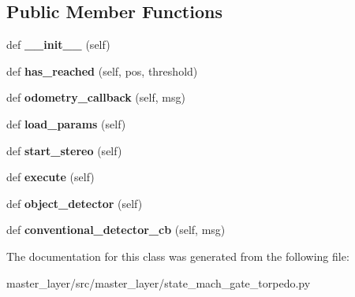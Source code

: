 \subsection*{Public Member Functions}
\begin{DoxyCompactItemize}
\item 
\mbox{\label{classmaster__layer_1_1state__mach__gate__torpedo_1_1TaskBaseClass_a4fbe819d814e67f1d400c6328b3c820f}} 
def {\bfseries \+\_\+\+\_\+init\+\_\+\+\_\+} (self)
\item 
\mbox{\label{classmaster__layer_1_1state__mach__gate__torpedo_1_1TaskBaseClass_a1b3443fc2ade0957367cefcae503b886}} 
def {\bfseries has\+\_\+reached} (self, pos, threshold)
\item 
\mbox{\label{classmaster__layer_1_1state__mach__gate__torpedo_1_1TaskBaseClass_ae5dc7fc14c8e6e975122a2663155ee6b}} 
def {\bfseries odometry\+\_\+callback} (self, msg)
\item 
\mbox{\label{classmaster__layer_1_1state__mach__gate__torpedo_1_1TaskBaseClass_a5056b817ec9fbab14bed99870a5df1ee}} 
def {\bfseries load\+\_\+params} (self)
\item 
\mbox{\label{classmaster__layer_1_1state__mach__gate__torpedo_1_1TaskBaseClass_a532eed3ea90c99e2f308ad12b3b808fd}} 
def {\bfseries start\+\_\+stereo} (self)
\item 
\mbox{\label{classmaster__layer_1_1state__mach__gate__torpedo_1_1TaskBaseClass_a580eb779112beba70e4277236dd7900d}} 
def {\bfseries execute} (self)
\item 
\mbox{\label{classmaster__layer_1_1state__mach__gate__torpedo_1_1TaskBaseClass_aa87c04ae55f6e40f7eb655017e37eb2f}} 
def {\bfseries object\+\_\+detector} (self)
\item 
\mbox{\label{classmaster__layer_1_1state__mach__gate__torpedo_1_1TaskBaseClass_a211afd1306e10da5c8fc8d5934d1fc81}} 
def {\bfseries conventional\+\_\+detector\+\_\+cb} (self, msg)
\end{DoxyCompactItemize}


The documentation for this class was generated from the following file\+:\begin{DoxyCompactItemize}
\item 
master\+\_\+layer/src/master\+\_\+layer/state\+\_\+mach\+\_\+gate\+\_\+torpedo.\+py\end{DoxyCompactItemize}
